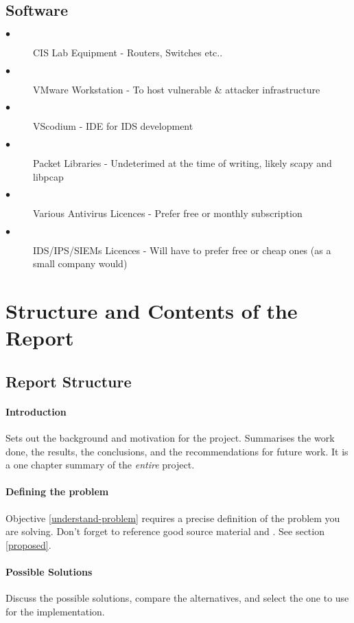 \subsection{Software}
\begin{description}
	\item[$\bullet$] CIS Lab Equipment - Routers, Switches etc..
	\item[$\bullet$] VMware Workstation - To host vulnerable & attacker infrastructure
	\item[$\bullet$] VScodium - IDE for IDS development
	\item[$\bullet$] Packet Libraries - Undeterimed at the time of writing, likely scapy and libpcap
	\item[$\bullet$] Various Antivirus Licences - Prefer free or monthly subscription
	\item[$\bullet$] IDS/IPS/SIEMs Licences - Will have to prefer free or cheap ones (as a small company would)
\end{description}

\section{Structure and Contents of the Report}
\subsection{Report Structure}

\paragraph{Introduction}  Sets out the background and motivation for the project.  Summarises the work done, the results, the conclusions, and the recommendations for future work.  It is a one chapter summary of the \emph{entire} project.

\paragraph{Defining the problem}  Objective \ref{understand-problem} requires a precise definition of the problem you are solving.  Don't forget to reference good source material \citep{henning_schulzrinne} and \citep{talbot2013}.  See section \ref{proposed}.

\paragraph{Possible Solutions} Discuss the possible solutions, compare the
alternatives, and select the one to use for the  implementation.

